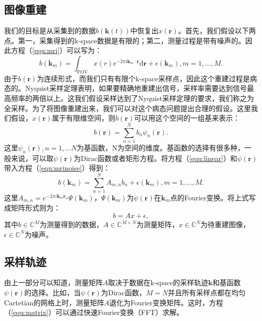 \subsection{图像重建}
我们的目标是从采集到的数据$b(\mathrm{\textbf{k}}(t))$中恢复出$x(\mathrm{\textbf{r}})$。首先，我们假设以下两点。第一，采集得到的k-space数据是有限的；第二，测量过程是带有噪声的。因此方程（\ref{equ:mri}）可以写为：
\begin{equation}
	b(\mathrm{\textbf{k}}_m) = \int_{\mathrm{FOV}} x(r)e^{-2\pi i \mathrm{\textbf{k}}_m \cdot \mathrm{\textbf{r}}}\mathrm{d}\mathrm{\textbf{r}} + \epsilon(\mathrm{\textbf{k}}_m), m=1,...,M.
	\label{equ:mrinoise}
\end{equation}
由于$b(\mathrm{\textbf{r}})$为连续形式，而我们只有有限个k-space采样点，因此这个重建过程是病态的。Nyquist采样定理表明，如果要精确地重建出信号，采样率需要达到信号最高频率的两倍以上。这我们假设采样达到了Nyquist采样定理的要求，我们称之为全采样。为了将图像重建出来，我们可以对这个病态问题提出合理的假设。这里我们假设，$x(\mathrm{\textbf{r}})$属于有限维空间，则$b(\mathrm{\textbf{r}})$可以用这个空间的一组基来表示：
\begin{equation}
	b(\mathrm{\textbf{r}})=\sum_{n=1}^N b_n\psi_n(\mathrm{\textbf{r}}).
	\label{equ:linear}
\end{equation}
这里$\psi_{n}(\mathrm{\textbf{r}}), n=1,...N$为基函数，N为空间的维度。基函数的选择有很多种，一般来说，可以取$\psi(\mathrm{\textbf{r}})$为Dirac函数或者矩形方程。将方程（\ref{equ:linear}）和$\psi(\mathrm{\textbf{r}})$带入方程（\ref{equ:mrinoise}）得到：
\begin{equation}
	b(\mathrm{\textbf{k}}_m) = \sum_{n=1}^N A_{m,n}b_n + \epsilon(\mathrm{\textbf{k}}_m), m=1,...,M.
\end{equation}
这里$A_{m,n}=e^{-2\pi i\mathrm{\textbf{k}}_m\mathrm{\textbf{r}}_n}\Psi(\mathrm{\textbf{k}}_m)$，$\Psi(\mathrm{\textbf{k}}_m)$为$\psi(\mathrm{\textbf{r}})$在$\mathrm{\textbf{k}}_m$点的Fourier变换。将上式写成矩阵形式则为：
\begin{equation}
	b=Ax+\epsilon,
	\label{equ:matrix}
\end{equation}
其中$b\in \mathbb{C}^M$为测量得到的数据，$A\in \mathbb{C}^{M\times N}$为测量矩阵，$x\in \mathbb{C}^N$为待重建图像，$\epsilon \in \mathbb{C}^N$为噪声。

\subsection{采样轨迹}
由上一部分可以知道，测量矩阵$A$取决于数据在k-space的采样轨迹$\mathrm{\textbf{k}}$和基函数$\psi(\mathrm{\textbf{r}})$的选择。比如，当$\psi(\mathrm{\textbf{r}})$为Dirac函数，$M=N$并且所有采样点都在均匀Cartetian的网格上时，测量矩阵$A$退化为Fourier变换矩阵。这时，方程（\ref{equ:matrix}）可以通过快速Fourier变换（FFT）求解。


